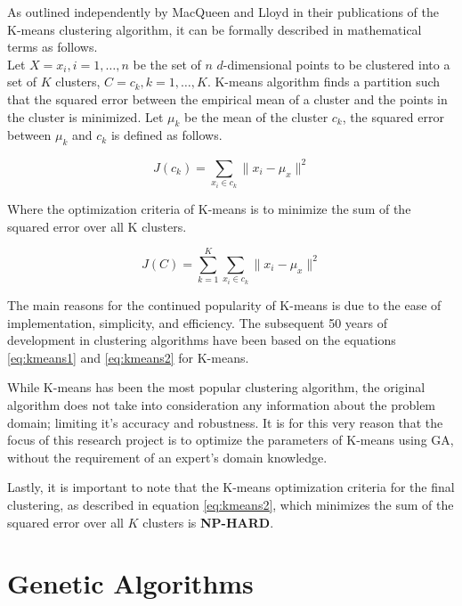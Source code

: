 \documentclass{article}
\newcommand{\bold}[1]{\textbf{#1}}
\begin{document}
As outlined independently by MacQueen and Lloyd in their publications of the K-means clustering algorithm, it can be formally described in mathematical terms as follows.\\

Let $X = {x_i}, i = 1, \ldots, n$ be the set of $n$ $d$-dimensional points to be clustered into a set of $K$ clusters, $C = {c_k, k = 1, \ldots, K}$. K-means algorithm finds a partition such that the squared error between the empirical mean of a cluster and the points in the cluster is minimized. Let $\mu_k$ be the mean of the cluster $c_k$, the squared error between $\mu_k$ and $c_k$ is defined as follows.

\begin{equation}
J(c_k) = \sum_{x_i \in c_k}^{} \|x_i - \mu_x\|^{2}
\label{eq:kmeans1}
\end{equation}

Where the optimization criteria of K-means is to minimize the sum of the squared error over all K clusters.

\begin{equation}
J(C) = \sum_{k = 1}^{K} \sum_{x_i \in c_k}^{} \|x_i - \mu_x\|^{2}
\label{eq:kmeans2}
\end{equation}


The main reasons for the continued popularity of K-means is due to the ease of implementation, simplicity, and efficiency\cite{jain2010}. The subsequent 50 years of development in clustering algorithms have been based on the equations \ref{eq:kmeans1} and \ref{eq:kmeans2} for K-means. 

While K-means has been the most popular clustering algorithm, the original algorithm does not take into consideration any information about the problem domain; limiting it's accuracy and robustness. It is for this very reason that the focus of this research project is to optimize the parameters of K-means using GA, without the requirement of an expert's domain knowledge.

Lastly, it is important to note that the K-means optimization criteria for the final clustering, as described in equation \ref{eq:kmeans2}, which minimizes the sum of the squared error over all $K$ clusters is \bold{NP-HARD}\cite{drineas2004clustering}.




\section{Genetic Algorithms}
\end{document}
